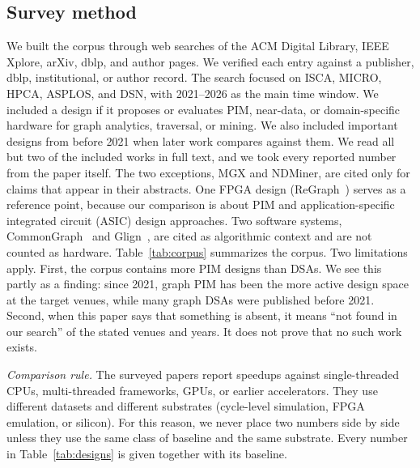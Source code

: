 \documentclass[journal,onecolumn]{IEEEtran}
\begin{document}
\subsection{Survey method}
We built the corpus through web searches of the ACM Digital Library, IEEE Xplore, arXiv, dblp, and author pages. We verified each entry against a publisher, dblp, institutional, or author record. The search focused on ISCA, MICRO, HPCA, ASPLOS, and DSN, with 2021--2026 as the main time window. We included a design if it proposes or evaluates PIM, near-data, or domain-specific hardware for graph analytics, traversal, or mining. We also included important designs from before 2021 when later work compares against them. We read all but two of the included works in full text, and we took every reported number from the paper itself. The two exceptions, MGX and NDMiner, are cited only for claims that appear in their abstracts. One FPGA design (ReGraph~\cite{chen2022regraph}) serves as a reference point, because our comparison is about PIM and application-specific integrated circuit (ASIC) design approaches. Two software systems, CommonGraph~\cite{afarin2023commongraph} and Glign~\cite{yin2023glign}, are cited as algorithmic context and are not counted as hardware. Table~\ref{tab:corpus} summarizes the corpus. Two limitations apply. First, the corpus contains more PIM designs than DSAs. We see this partly as a finding: since 2021, graph PIM has been the more active design space at the target venues, while many graph DSAs were published before 2021. Second, when this paper says that something is absent, it means ``not found in our search'' of the stated venues and years. It does not prove that no such work exists.

\emph{Comparison rule.} The surveyed papers report speedups against single-threaded CPUs, multi-threaded frameworks, GPUs, or earlier accelerators. They use different datasets and different substrates (cycle-level simulation, FPGA emulation, or silicon). For this reason, we never place two numbers side by side unless they use the same class of baseline and the same substrate. Every number in Table~\ref{tab:designs} is given together with its baseline.
\end{document}
